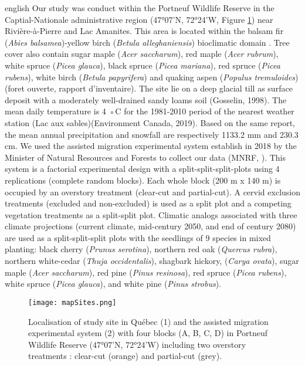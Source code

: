 \begin{otherlanguage*}{english}
  Our study was conduct within the Portneuf Wildlife Reserve in the Captial-Nationale administrative region (47°07'N, 72°24'W, Figure \ref{fig:cartoblock}) near Rivière-à-Pierre and Lac Amanites. 
  This area is located within the balsam fir (\textit{Abies balsamea})-yellow birch (\textit{Betula alleghaniensis}) bioclimatic domain \citep{saucierChapitreEcologieForestiere2009}.
  Tree cover also contain sugar maple (\textit{Acer saccharum}), red maple (\textit{Acer rubrum}), white spruce (\textit{Picea glauca}), black spruce (\textit{Picea mariana}), red spruce (\textit{Picea rubens}),
  white birch (\textit{Betula papyrifera}) and quaking aspen (\textit{Populus tremuloides}) (foret ouverte, rapport d'inventaire). 
  The site lie on a deep glacial till as surface deposit with a moderately well-drained sandy loams soil (Gosselin, 1998).
  The mean daily temperature is 4 ◦C for the 1981-2010 period of the nearest weather station (Lac aux sables)(Environment Canada, 2019). 
  Based on the same report, the mean annual precipitation and snowfall are respectively 1133.2 mm and 230.3 cm.
  We used the assisted migration experimental system establish in 2018 by the Minister of Natural Resources and Forests to collect our data (MNRF, \citealp{royoDesiredREgenerationAssisted2023}).
  This system is a factorial experimental design with a split-split-split-plots using 4 replications (complete random blocks). 
  Each whole block (200 m x 140 m) is occupied by an overstory treatment (clear-cut and partial-cut). 
  A cervid exclusion treatments (excluded and non-excluded) is used as a split plot and a competing vegetation treatments as a split-split plot. 
  Climatic analogs associated with three climate projections (current climate, mid-century 2050, and end of century 2080) 
  are used as a split-split-split plots with the seedlings of 9 species in mixed planting: black cherry (\textit{Prunus serotina}), northern red oak (\textit{Quercus rubra}), 
  northern white-cedar (\textit{Thuja occidentalis}), shagbark hickory, (\textit{Carya ovata}), sugar maple (\textit{Acer saccharum}), red pine (\textit{Pinus resinosa}), 
  red spruce (\textit{Picea rubens}), white spruce (\textit{Picea glauca}), and white pine (\textit{Pinus strobus}).

\end{otherlanguage*}

\begin{figure}[ht!]
	\centering
	\texttt{[image: mapSites.png]}
	\caption[Localisation of study site in Québec, Canada.]{Localisation of study site in Québec (1) and the assisted migration experimental system (2) with four blocks (A, B, C, D) in Portneuf Wildlife Reserve (47°07'N, 72°24'W) including two overstory treatments : clear-cut (orange) and partial-cut (grey).}
	\label{fig:cartoblock}
	\end{figure}  



